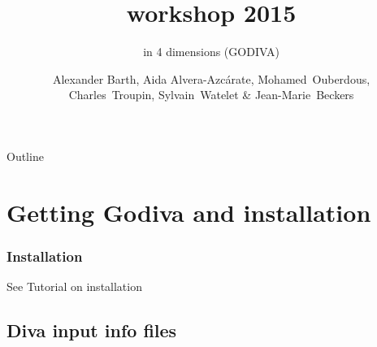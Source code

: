 
\parindent 0cm

\author[Alexander Barth, Aida Alvera-Azc\'{a}rate, Mohamed~Ouberdous, Charles~Troupin, Sylvain~Watelet \& Jean-Marie~Beckers]{Alexander Barth, Aida Alvera-Azc\'{a}rate, Mohamed~Ouberdous,\\
 Charles~Troupin, Sylvain~Watelet \& Jean-Marie~Beckers}
  
\title[]{\diva workshop 2015}
\subtitle{\diva in 4 dimensions (GODIVA)}
\date{}


\maketitlepage %





\begin{frame}{Outline}
  \tableofcontents
\end{frame}


\section{Getting Godiva and installation}


\begin{frame}[c]
\frametitle{Installation}
\huge
See Tutorial on installation \href{run:./DivaWorkshop2015_installation.pdf}{}


\end{frame}


\subsection{Diva input info files}

